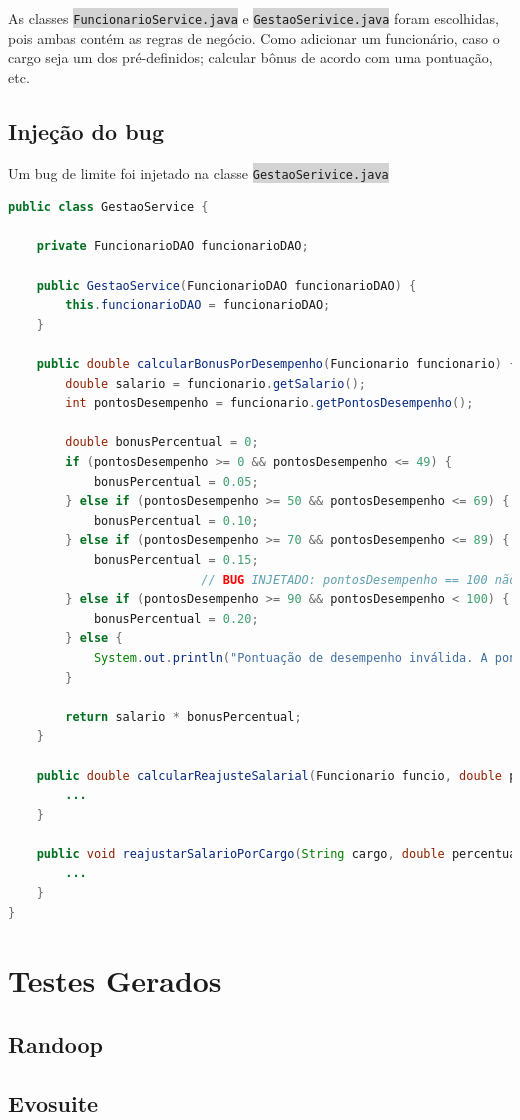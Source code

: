 \documentclass[10pt]{article}
\begin{document}
As classes \colorbox{lightgray}{\texttt{\fontsize{12pt}{12pt}\selectfont FuncionarioService.java}} e \colorbox{lightgray}{\texttt{\fontsize{12pt}{12pt}\selectfont GestaoSerivice.java}} foram escolhidas, pois ambas contém as regras de negócio. Como adicionar um funcionário, caso o cargo seja um dos pré-definidos; calcular bônus de acordo com uma pontuação, etc.

\subsection{Injeção do bug}


Um bug de limite foi injetado na classe \colorbox{lightgray}{\texttt{\fontsize{12pt}{12pt}\selectfont GestaoSerivice.java}}

\begin{mdframed}[backgroundcolor=gray!10]
\begin{lstlisting}[language=Java]
public class GestaoService {

    private FuncionarioDAO funcionarioDAO;

    public GestaoService(FuncionarioDAO funcionarioDAO) {
        this.funcionarioDAO = funcionarioDAO;
    }

    public double calcularBonusPorDesempenho(Funcionario funcionario) {
        double salario = funcionario.getSalario();
        int pontosDesempenho = funcionario.getPontosDesempenho();
        
        double bonusPercentual = 0;
        if (pontosDesempenho >= 0 && pontosDesempenho <= 49) {
            bonusPercentual = 0.05;
        } else if (pontosDesempenho >= 50 && pontosDesempenho <= 69) {
            bonusPercentual = 0.10;
        } else if (pontosDesempenho >= 70 && pontosDesempenho <= 89) {
            bonusPercentual = 0.15;
                           // BUG INJETADO: pontosDesempenho == 100 não é avaliado
        } else if (pontosDesempenho >= 90 && pontosDesempenho < 100) {
            bonusPercentual = 0.20;
        } else {
            System.out.println("Pontuação de desempenho inválida. A pontuação deve ser entre 0 e 100.");
        }

        return salario * bonusPercentual;
    }

    public double calcularReajusteSalarial(Funcionario funcio, double percentual) {
        ...
    }

    public void reajustarSalarioPorCargo(String cargo, double percentualReajuste) {
        ...
    }
}

\end{lstlisting}
\end{mdframed}

\section{Testes Gerados}

\subsection{Randoop}

\subsection{Evosuite}
\end{document}
